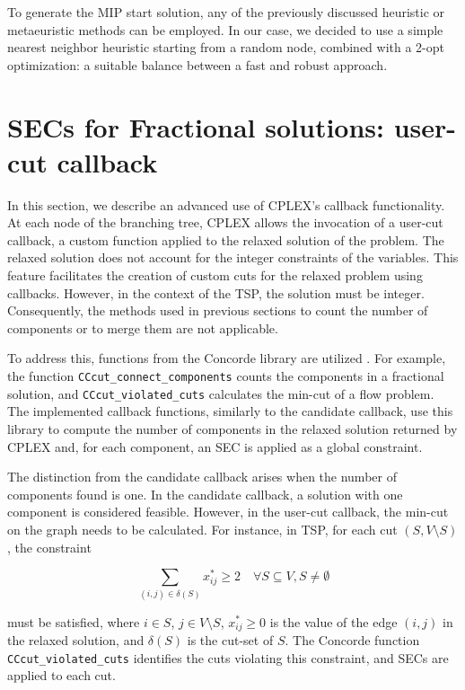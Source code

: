 To generate the MIP start solution, any of the previously discussed heuristic or metaeuristic methods can be employed. In our case, we decided to use a simple nearest neighbor heuristic starting from a random node, combined with a 2-opt optimization: a suitable balance between a fast and robust approach.

\section{SECs for Fractional solutions: user-cut callback}
In this section, we describe an advanced use of CPLEX’s callback functionality. At each node of the branching tree, CPLEX allows the invocation of a user-cut callback, a custom function applied to the relaxed solution of the problem. The relaxed solution does not account for the integer constraints of the variables. This feature facilitates the creation of custom cuts for the relaxed problem using callbacks. However, in the context of the TSP, the solution must be integer. Consequently, the methods used in previous sections to count the number of components or to merge them are not applicable.

To address this, functions from the Concorde library are utilized \cite{conc}. For example, the function \texttt{CCcut\_connect\_components} counts the components in a fractional solution, and \texttt{CCcut\_violated\_cuts} calculates the min-cut of a flow problem. The implemented callback functions, similarly to the candidate callback, use this library to compute the number of components in the relaxed solution returned by CPLEX and, for each component, an SEC is applied as a global constraint.

The distinction from the candidate callback arises when the number of components found is one. In the candidate callback, a solution with one component is considered feasible. However, in the user-cut callback, the min-cut on the graph needs to be calculated. For instance, in TSP, for each cut $(S, V \setminus S)$, the constraint

\begin{equation}
\sum_{(i,j) \in \delta(S)} x_{ij}^* \geq 2 \quad \forall S \subseteq V, S \neq \emptyset
\end{equation}

must be satisfied, where $i \in S$, $j \in V \setminus S$, $x_{ij}^* \geq 0$ is the value of the edge $(i, j)$ in the relaxed solution, and $\delta(S)$ is the cut-set of $S$. The Concorde function \texttt{CCcut\_violated\_cuts} identifies the cuts violating this constraint, and SECs are applied to each cut.

